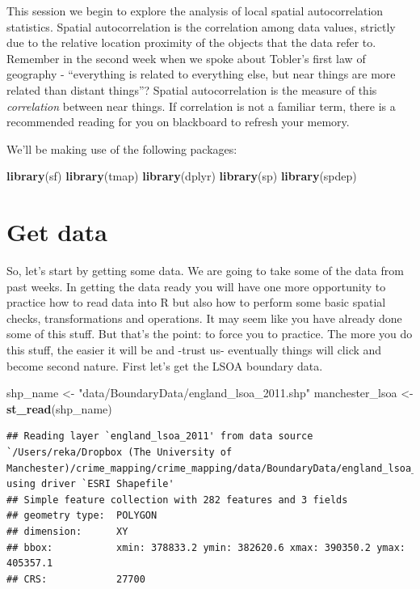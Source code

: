 \documentclass[]{book}
\newenvironment{Shaded}{\begin{snugshade}}{\end{snugshade}}
\newcommand{\KeywordTok}[1]{\textcolor[rgb]{0.13,0.29,0.53}{\textbf{#1}}}
\newcommand{\NormalTok}[1]{#1}
\newcommand{\StringTok}[1]{\textcolor[rgb]{0.31,0.60,0.02}{#1}}
\begin{document}
This session we begin to explore the analysis of local spatial autocorrelation statistics. Spatial autocorrelation is the correlation among data values, strictly due to the relative location proximity of the objects that the data refer to. Remember in the second week when we spoke about Tobler's first law of geography - ``everything is related to everything else, but near things are more related than distant things''? Spatial autocorrelation is the measure of this \emph{correlation} between near things. If correlation is not a familiar term, there is a recommended reading for you on blackboard to refresh your memory.

We'll be making use of the following packages:

\begin{Shaded}
\begin{Highlighting}[]
\KeywordTok{library}\NormalTok{(sf)}
\KeywordTok{library}\NormalTok{(tmap)}
\KeywordTok{library}\NormalTok{(dplyr)}
\KeywordTok{library}\NormalTok{(sp)}
\KeywordTok{library}\NormalTok{(spdep)}
\end{Highlighting}
\end{Shaded}

\hypertarget{get-data}{%
\section{Get data}\label{get-data}}

So, let's start by getting some data. We are going to take some of the data from past weeks. In getting the data ready you will have one more opportunity to practice how to read data into R but also how to perform some basic spatial checks, transformations and operations. It may seem like you have already done some of this stuff. But that's the point: to force you to practice. The more you do this stuff, the easier it will be and -trust us- eventually things will click and become second nature. First let's get the LSOA boundary data.

\begin{Shaded}
\begin{Highlighting}[]
\NormalTok{shp_name <-}\StringTok{ "data/BoundaryData/england_lsoa_2011.shp"}
\NormalTok{manchester_lsoa <-}\StringTok{ }\KeywordTok{st_read}\NormalTok{(shp_name)}
\end{Highlighting}
\end{Shaded}

\begin{verbatim}
## Reading layer `england_lsoa_2011' from data source `/Users/reka/Dropbox (The University of Manchester)/crime_mapping/crime_mapping/data/BoundaryData/england_lsoa_2011.shp' using driver `ESRI Shapefile'
## Simple feature collection with 282 features and 3 fields
## geometry type:  POLYGON
## dimension:      XY
## bbox:           xmin: 378833.2 ymin: 382620.6 xmax: 390350.2 ymax: 405357.1
## CRS:            27700
\end{verbatim}
\end{document}

